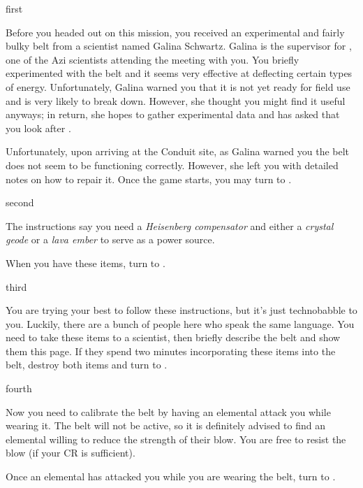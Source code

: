 \documentclass[notebook]{elementals}
\begin{document}

\startnotebook{\nBelt{}}

\begin{page}{first}

Before you headed out on this mission, you received an experimental and fairly bulky belt from a scientist named Galina Schwartz. Galina is the supervisor for \cScientist{\intro}, one of the Azi scientists attending the meeting with you. You briefly experimented with the belt and it seems very effective at deflecting certain types of energy. Unfortunately, Galina warned you that it is not yet ready for field use and is very likely to break down. However, she thought you might find it useful anyways; in return, she hopes to gather experimental data and has asked that you look after \cScientist{}.

Unfortunately, upon arriving at the Conduit site, as Galina warned you the belt does not seem to be functioning correctly. However, she left you with detailed notes on how to repair it. Once the game starts, you may turn to .

\end{page}

\begin{page}{second}

The instructions say you need a \emph{Heisenberg compensator} and either a \emph{crystal geode} or a \emph{lava ember} to serve as a power source.

When you have these items, turn to . 

\end{page}

\begin{page}{third}

You are trying your best to follow these instructions, but it's just technobabble to you. Luckily, there are a bunch of people here who speak the same language. You need to take these items to a scientist, then briefly describe the belt and show them this page. If they spend two minutes incorporating these items into the belt, destroy both items and turn to .

\end{page}

\begin{page}{fourth}

Now you need to calibrate the belt by having an elemental attack you while wearing it. The belt will not be active, so it is definitely advised to find an elemental willing to reduce the strength of their blow. You are free to resist the blow (if your CR is sufficient).

Once an elemental has attacked you while you are wearing the belt, turn to .

\end{page}
\end{document}
